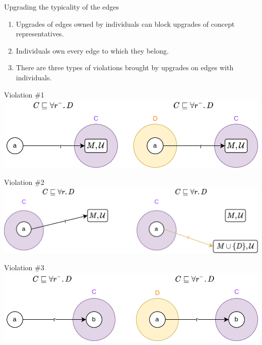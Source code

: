 \documentclass[10pt]{beamer}
\begin{document}
\begin{frame}{Upgrading the typicality of the edges}

  { \Large 
  \begin{enumerate}
    \item Upgrades of edges owned by individuals can block upgrades of concept representatives. \pause
    \item Individuals own every edge to which they belong. \pause
    \item There are three types of violations brought by upgrades on edges with individuals.
\end{enumerate}
  }
\end{frame}

\begin{frame}{Violation \#1}
  \includegraphics[scale=0.33]{img/repair_incon.png}
\end{frame}

\begin{frame}{Violation \#2}
  \includegraphics[scale=0.3]{img/repair_conin.png}
\end{frame}

\begin{frame}{Violation \#3}
  \includegraphics[scale=0.33]{img/repair_inin.png}
\end{frame}
\end{document}
